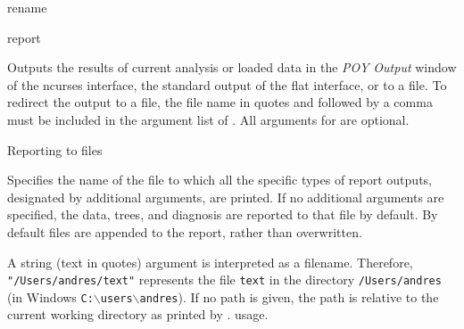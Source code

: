 \begin{command}{rename}{}
\begin{arguments}
          \end{arguments}
          
          \begin{poyexamples}
    \end{poyexamples}

\end{command}
        
\begin{command}{report}{}


	\begin{poydescription} 
        Outputs the results of current analysis or loaded data in the \emph{POY Output}
        window of the ncurses interface, the standard output of the flat
        interface, or to a file. To redirect the output to a file, the file name in 
        quotes and followed by a comma must be included in the argument list
        of . All arguments for  are
        optional. 
	\end{poydescription}

	\begin{arguments}

        \begin{argumentgroup}{Reporting to files}{}

                {Specifies the name of the file to which all the specific types of report outputs,
                designated by additional arguments, are printed. If no additional arguments
                are specified, the data, trees, and diagnosis are reported to that file by
                default. By default files are appended to the report, rather than overwritten.
                
                A string (text in quotes) argument is interpreted as a filename.
                Therefore, \texttt{"/Users/andres/text"} represents the file \texttt{text} in
                the directory \texttt{/Users/andres} (in Windows
                \texttt{C:$\backslash$users$\backslash$andres}). If no path is given, the path
                is relative to the current working directory as printed by
                .
                usage.} 
                {}
                

\end{argumentgroup}
\end{arguments}
\end{command}
